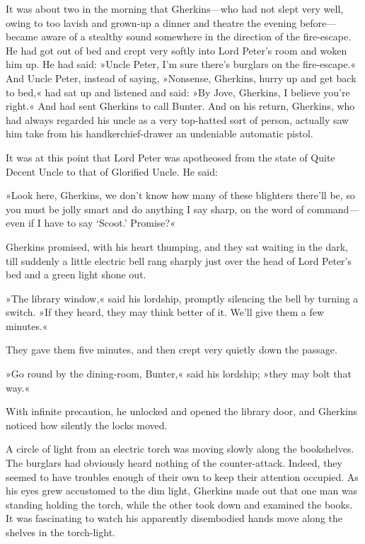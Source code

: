 It was about two in the morning that Gherkins—who had not slept very well, owing to too lavish and grown-up a dinner and theatre the evening before—became aware of a stealthy sound somewhere in the direction of the fire-escape. He had got out of bed and crept very softly into Lord Peter's room and woken him up. He had said: »Uncle Peter, I'm sure there's burglars on the fire-escape.« And Uncle Peter, instead of saying, »Nonsense, Gherkins, hurry up and get back to bed,« had sat up and listened and said: »By Jove, Gherkins, I believe you're right.« And had sent Gherkins to call Bunter. And on his return, Gherkins, who had always regarded his uncle as a very top-hatted sort of person, actually saw him take from his handkerchief-drawer an undeniable automatic pistol.

It was at this point that Lord Peter was apotheosed from the state of Quite Decent Uncle to that of Glorified Uncle. He said:

»Look here, Gherkins, we don't know how many of these blighters there'll be, so you must be jolly smart and do anything I say sharp, on the word of command—even if I have to say `Scoot.' Promise?«

Gherkins promised, with his heart thumping, and they sat waiting in the dark, till suddenly a little electric bell rang sharply just over the head of Lord Peter's bed and a green light shone out.

»The library window,« said his lordship, promptly silencing the bell by turning a switch. »If they heard, they may think better of it. We'll give them a few minutes.«

They gave them five minutes, and then crept very quietly down the passage.

»Go round by the dining-room, Bunter,« said his lordship; »they may bolt that way.«

With infinite precaution, he unlocked and opened the library door, and Gherkins noticed how silently the locks moved.

A circle of light from an electric torch was moving slowly along the bookshelves. The burglars had obviously heard nothing of the counter-attack. Indeed, they seemed to have troubles enough of their own to keep their attention occupied. As his eyes grew accustomed to the dim light, Gherkins made out that one man was standing holding the torch, while the other took down and examined the books. It was fascinating to watch his apparently disembodied hands move along the shelves in the torch-light.

